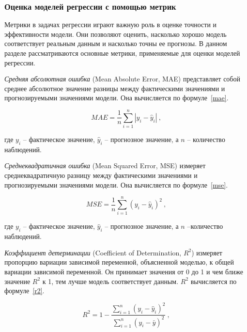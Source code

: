 \subsubsection*{Оценка моделей регрессии с помощью метрик}

Метрики в задачах регрессии играют важную роль в оценке точности и эффективности модели. Они позволяют оценить, насколько хорошо модель соответствует реальным данным и насколько точны ее прогнозы. В данном разделе рассматриваются основные метрики, применяемые для оценки моделей регрессии.

\textit{Средняя абсолютная ошибка} (Mean Absolute Error, MAE) представляет собой среднее абсолютное значение разницы между фактическими значениями и прогнозируемыми значениями модели. Она вычисляется по формуле~\ref{mae}.

\begin{equation}
\label{mae}
    MAE = \frac{1}{n} \sum_{i=1}^{n} |y_i - \hat{y}_i|  \ ,
\end{equation}
\vspace{0.3em}

где \( y_i \) -- фактическое значение, \( \hat{y}_i \) -- прогнозное значение, а \( n \) -- количество наблюдений.
\vspace{1em}

\textit{Среднеквадратичная ошибка} (Mean Squared Error, MSE) измеряет среднеквадратичную разницу между фактическими значениями и прогнозируемыми значениями модели. Она вычисляется по формуле~\ref{mse}.

\begin{equation}
\label{mse}
    MSE = \frac{1}{n} \sum_{i=1}^{n} (y_i - \hat{y}_i)^2 \ ,
\end{equation}
\vspace{0.3em}

где \( y_i \) -- фактическое значение, \( \hat{y}_i \) -- прогнозное значение, а \( n \) --количество наблюдений.
\vspace{1em}

\textit{Коэффициент детерминации} (Coefficient of Determination, \( R^2 \)) измеряет пропорцию вариации зависимой переменной, объясненной моделью, к общей вариации зависимой переменной. Он принимает значения от 0 до 1 и чем ближе значение \( R^2 \) к 1, тем лучше модель соответствует данным. \( R^2 \) вычисляется по формуле~\ref{r2}.

\begin{equation}
\label{r2}
R^2 = 1 - \frac{\sum_{i=1}^{n} (y_i - \hat{y}_i)^2}{\sum_{i=1}^{n} (y_i - \bar{y})^2} \ ,
\end{equation}
\vspace{0.3em}

